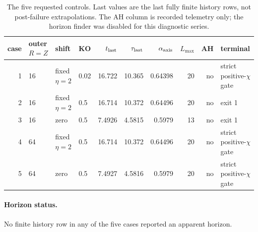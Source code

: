\begin{table}[t]
\centering
\small
\begin{tabular}{rlllrrrrrl}
\toprule
case & outer $R=Z$ & shift & KO & $t_{\rm last}$ & $\tau_{\rm last}$ & $\alpha_{\rm axis}$ & $L_{\max}$ & AH & terminal \\
\midrule
1 & 16 & fixed $\eta=2$ & 0.02 & 16.722 & 10.365 & 0.64398 & 20 & no & strict positive-$\chi$ gate \\
2 & 16 & fixed $\eta=2$ & 0.5 & 16.714 & 10.372 & 0.64496 & 20 & no & exit 1 \\
3 & 16 & zero & 0.5 & 7.4926 & 4.5815 & 0.5979 & 13 & no & exit 1 \\
4 & 64 & fixed $\eta=2$ & 0.5 & 16.714 & 10.372 & 0.64496 & 20 & no & strict positive-$\chi$ gate \\
5 & 64 & zero & 0.5 & 7.4927 & 4.5816 & 0.5979 & 20 & no & strict positive-$\chi$ gate \\
\bottomrule
\end{tabular}
\caption{The five requested controls.  Last values are the last fully finite history rows, not post-failure extrapolations.  The AH column is recorded telemetry only; the horizon finder was disabled for this diagnostic series.}
\label{tab:five-cases}
\end{table}
\paragraph{Horizon status.} No finite history row in any of the five cases reported an apparent horizon.
